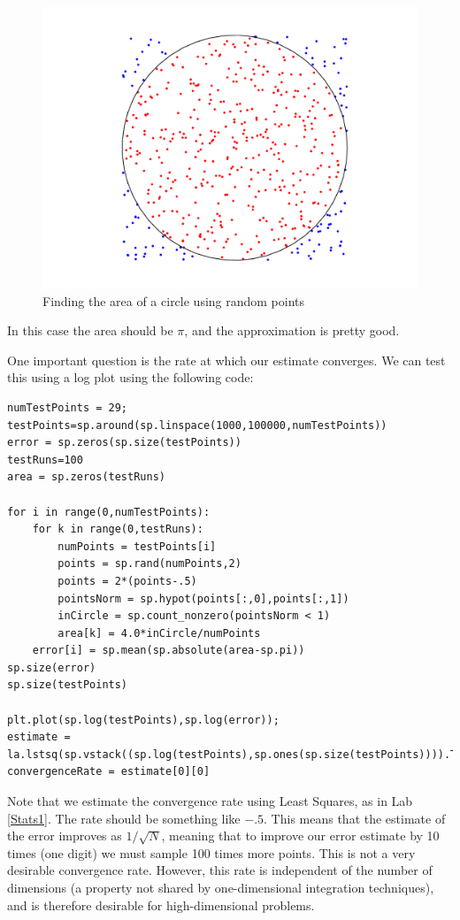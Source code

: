 \begin{figure}[h!]
\begin{center}
\includegraphics[scale = .4]{MCCircle}
\caption{Finding the area of a circle using random points}
\label{Fig:MCCircle}
\end{center}
\end{figure}

In this case the area should be $\pi$, and the approximation is pretty good.

One important question is the rate at which our estimate converges. We can test this using a log plot using the following code:
\begin{lstlisting}[style=python]
numTestPoints = 29;
testPoints=sp.around(sp.linspace(1000,100000,numTestPoints))
error = sp.zeros(sp.size(testPoints))
testRuns=100
area = sp.zeros(testRuns)

for i in range(0,numTestPoints):
	for k in range(0,testRuns):
		numPoints = testPoints[i]
		points = sp.rand(numPoints,2)
		points = 2*(points-.5)
		pointsNorm = sp.hypot(points[:,0],points[:,1])
		inCircle = sp.count_nonzero(pointsNorm < 1)
		area[k] = 4.0*inCircle/numPoints
	error[i] = sp.mean(sp.absolute(area-sp.pi))
sp.size(error)
sp.size(testPoints)

plt.plot(sp.log(testPoints),sp.log(error));
estimate = la.lstsq(sp.vstack((sp.log(testPoints),sp.ones(sp.size(testPoints)))).T,sp.log(error))
convergenceRate = estimate[0][0]
\end{lstlisting}

Note that we estimate the convergence rate using Least Squares, as in Lab \ref{Stats1}. The rate should be something like $-.5$. This means that the estimate of the error improves as $1/\sqrt{N}$, meaning that to improve our error estimate by 10 times (one digit) we must sample 100 times more points. This is not a very desirable convergence rate. However, this rate is independent of the number of dimensions (a property not shared by one-dimensional integration techniques), and is therefore desirable for high-dimensional problems.

